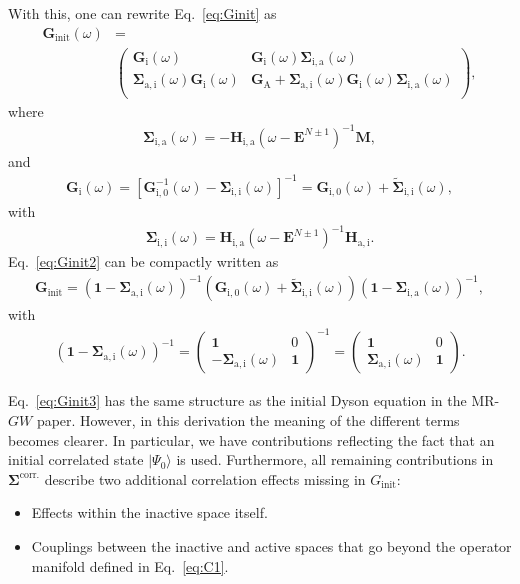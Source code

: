 \documentclass[aip,jcp,reprint,noshowkeys,superscriptaddress]{revtex4-1}
\newcommand{\bG}{\boldsymbol{G}}
\newcommand{\bH}{\boldsymbol{H}}
\newcommand{\bM}{\boldsymbol{M}}
\newcommand{\bE}{\boldsymbol{E}}
\newcommand{\bSigma}{\boldsymbol{\Sigma}}
\begin{document}
With this, one can rewrite Eq.~\eqref{eq:Ginit} as
\begin{align}
  \bG_{\text{init}}(\omega) &= \nonumber \\
 &\begin{pmatrix}
    \bG_\mathrm{i}(\omega) & \bG_\mathrm{i}(\omega) \bSigma_\mathrm{i,a}(\omega) \\
    \bSigma_\mathrm{a,i}(\omega) \bG_\mathrm{i}(\omega) & \bG_\mathrm{A} + \bSigma_\mathrm{a,i}(\omega) \bG_\mathrm{i}(\omega) \bSigma_\mathrm{i,a}(\omega) \\
  \end{pmatrix},
  \label{eq:Ginit2}
\end{align}
where 
\begin{align}
  \bSigma_\mathrm{i,a}(\omega) = - \bH_\mathrm{i, a} \left( \omega - \bE^{N \pm 1} \right)^{-1} \bM \nonumber ,
\end{align}
and
\begin{align}
  \bG_\mathrm{i}(\omega) = \left[ \bG^{-1}_{\mathrm{i,0}}(\omega) - \bSigma_\mathrm{i,i}(\omega) \right]^{-1} = \bG_{\mathrm{i,0}}(\omega) + \tilde{\bSigma}_\mathrm{i,i}(\omega),
\end{align}
with 
\begin{align}
    \bSigma_\mathrm{i,i}(\omega) = \bH_\mathrm{i, a} \left( \omega - \bE^{N \pm 1} \right)^{-1} \bH_\mathrm{a, i}.
\end{align}
Eq.~\eqref{eq:Ginit2} can be compactly written as
\begin{align}
  \bG_\mathrm{init} = \left( \mathbf{1} - \bSigma_\mathrm{a,i}(\omega) \right)^{-1} \left( \bG_{\mathrm{i,0}}(\omega) + \tilde{\bSigma}_\mathrm{i,i}(\omega)  \right) \left( \mathbf{1} - \bSigma_\mathrm{i,a}(\omega) \right)^{-1},
  \label{eq:Ginit3}
\end{align}
with
\begin{align}
   \left( \mathbf{1} - \bSigma_\mathrm{a,i}(\omega) \right)^{-1} = 
   \begin{pmatrix}
    \mathbf{1} & 0  \\
    - \bSigma_\mathrm{a,i}(\omega) & \mathbf{1}
   \end{pmatrix}^{-1}
   = 
  \begin{pmatrix}
    \mathbf{1} & 0  \\
    \bSigma_\mathrm{a,i}(\omega) & \mathbf{1}
   \end{pmatrix}.
\end{align}

Eq.~\eqref{eq:Ginit3} has the same structure as the initial Dyson equation in the MR-$GW$ paper. 
However, in this derivation the meaning of the different terms becomes clearer.
In particular, we have contributions reflecting the fact that an initial correlated state $| \Psi_0 \rangle$ is used.
Furthermore, all remaining contributions in $\bSigma^\mathrm{corr.}$ describe two additional correlation effects missing in $G_{\mathrm{init}}$:
\begin{itemize}
\item Effects within the inactive space itself.
\item Couplings between the inactive and active spaces that go beyond the operator manifold defined in Eq.~\eqref{eq:C1}.
\end{itemize}
\end{document}

